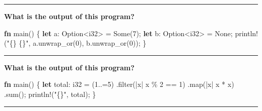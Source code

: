 \documentclass[
  11pt,
]{article}
\newenvironment{Shaded}{}{}
\newcommand{\ConstantTok}[1]{\textcolor[rgb]{0.53,0.00,0.00}{#1}}
\newcommand{\DataTypeTok}[1]{\textcolor[rgb]{0.56,0.13,0.00}{#1}}
\newcommand{\DecValTok}[1]{\textcolor[rgb]{0.25,0.63,0.44}{#1}}
\newcommand{\KeywordTok}[1]{\textcolor[rgb]{0.00,0.44,0.13}{\textbf{#1}}}
\newcommand{\NormalTok}[1]{#1}
\newcommand{\OperatorTok}[1]{\textcolor[rgb]{0.40,0.40,0.40}{#1}}
\newcommand{\PreprocessorTok}[1]{\textcolor[rgb]{0.74,0.48,0.00}{#1}}
\newcommand{\StringTok}[1]{\textcolor[rgb]{0.25,0.44,0.63}{#1}}
\begin{document}
\begin{center}\rule{0.5\linewidth}{0.5pt}\end{center}

\textbf{What is the output of this program?}

\begin{Shaded}
\begin{Highlighting}[]
\KeywordTok{fn}\NormalTok{ main() }\OperatorTok{\{}
    \KeywordTok{let}\NormalTok{ a}\OperatorTok{:} \DataTypeTok{Option}\OperatorTok{\textless{}}\DataTypeTok{i32}\OperatorTok{\textgreater{}} \OperatorTok{=} \ConstantTok{Some}\NormalTok{(}\DecValTok{7}\NormalTok{)}\OperatorTok{;}
    \KeywordTok{let}\NormalTok{ b}\OperatorTok{:} \DataTypeTok{Option}\OperatorTok{\textless{}}\DataTypeTok{i32}\OperatorTok{\textgreater{}} \OperatorTok{=} \ConstantTok{None}\OperatorTok{;}
    \PreprocessorTok{println!}\NormalTok{(}\StringTok{"\{\} \{\}"}\OperatorTok{,}\NormalTok{ a}\OperatorTok{.}\NormalTok{unwrap\_or(}\DecValTok{0}\NormalTok{)}\OperatorTok{,}\NormalTok{ b}\OperatorTok{.}\NormalTok{unwrap\_or(}\DecValTok{0}\NormalTok{))}\OperatorTok{;}
\OperatorTok{\}}
\end{Highlighting}
\end{Shaded}

\begin{center}\rule{0.5\linewidth}{0.5pt}\end{center}

\textbf{What is the output of this program?}

\begin{Shaded}
\begin{Highlighting}[]
\KeywordTok{fn}\NormalTok{ main() }\OperatorTok{\{}
    \KeywordTok{let}\NormalTok{ total}\OperatorTok{:} \DataTypeTok{i32} \OperatorTok{=}\NormalTok{ (}\DecValTok{1}\OperatorTok{..=}\DecValTok{5}\NormalTok{)}
        \OperatorTok{.}\NormalTok{filter(}\OperatorTok{|}\NormalTok{x}\OperatorTok{|}\NormalTok{ x }\OperatorTok{\%} \DecValTok{2} \OperatorTok{==} \DecValTok{1}\NormalTok{)}
        \OperatorTok{.}\NormalTok{map(}\OperatorTok{|}\NormalTok{x}\OperatorTok{|}\NormalTok{ x }\OperatorTok{*}\NormalTok{ x)}
        \OperatorTok{.}\NormalTok{sum()}\OperatorTok{;}
    \PreprocessorTok{println!}\NormalTok{(}\StringTok{"\{\}"}\OperatorTok{,}\NormalTok{ total)}\OperatorTok{;}
\OperatorTok{\}}
\end{Highlighting}
\end{Shaded}

\begin{center}\rule{0.5\linewidth}{0.5pt}\end{center}
\end{document}
